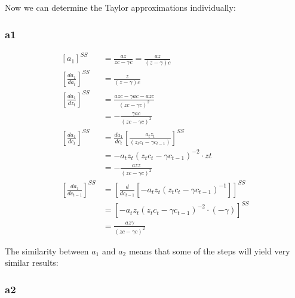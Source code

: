 \documentclass[11pt,preprint, authoryear]{elsarticle}
\numberwithin{equation}{section}
\numberwithin{figure}{section}
\numberwithin{table}{section}
\begin{document}
Now we can determine the Taylor approximations individually:

\hypertarget{a1}{%
\subsubsection{a1}\label{a1}}

\[\begin{aligned}
\left[ a_{1} \right]^{SS} &=  \frac{a z}{z c -\gamma c} = \frac{a z}{(z  -\gamma)c }
\\
\left[\frac{da_{1}}{da_{t}} \right]^{SS} &= 
\frac{z}{(z  -\gamma)c}
\\
\left[\frac{da_{1}}{dz_{t}} \right]^{SS} &= 
\frac{a z c- \gamma a c-a z c}{(z c- \gamma c)^{2}}
\\
&= -\frac{ \gamma a c}{(z c- \gamma c)^{2}}
\\
\left[\frac{da_{1}}{dc_{t}} \right]^{SS} &= 
\frac{da_{1}}{dc_{t}} 
\left[ \frac{a_{t} z_{t}}{(z_t c_{t}-\gamma c_{t-1})} \right]^{SS}\\
&= -a_{t} z_t\left(z_{t} c_{t} - \gamma c_{t-1}\right)^{-2} \cdot z t\\
&= - \frac {a z z} {(z c - \gamma c)^{2}}\\
\left[\frac{da_{1}}{dc_{t-1}} \right]^{SS} &=
\left[ \frac{d}{d c_{t-1}} \left[ -a_{t} z_{t} 
\left( z_{t} c_{t} - \gamma c_{t-1} \right)^{-1} \right] \right]^{SS}\\
&= \left[ -a_{t} z_{t}\left(z_{t} c_{t}-\gamma c_{t-1}\right)^{-2}
\cdot(-\gamma) \right]^{SS}\\
&= \frac{a z \gamma}{(z c-\gamma c)^{2}}
\end{aligned}\]

The similarity between \(a_1\) and \(a_2\) means that some of the steps
will yield very similar results:

\hypertarget{a2}{%
\subsubsection{a2}\label{a2}}
\end{document}
